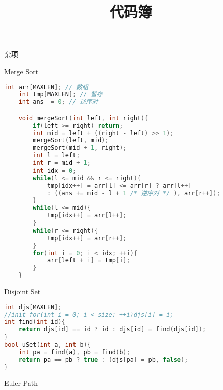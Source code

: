 \documentclass{article}
\title{代码簿}
\begin{document}
	\maketitle

	\begin{enumerate}

	{\bf \LARGE \item  杂项}

	\begin{itemize}

	{\bf \item  Merge Sort}
	\begin{lstlisting}[language = C++]
	int arr[MAXLEN]; // 数组
	int tmp[MAXLEN]; // 暂存
	int ans  = 0; // 逆序对

	void mergeSort(int left, int right){
		if(left >= right) return;
		int mid = left + ((right - left) >> 1);
		mergeSort(left, mid);
		mergeSort(mid + 1, right);
		int l = left;
		int r = mid + 1;
		int idx = 0;	
		while(l <= mid && r <= right){		
			tmp[idx++] = arr[l] <= arr[r] ? arr[l++] 
			: ((ans += mid - l + 1 /* 逆序对 */ ), arr[r++]);
		}
		while(l <= mid){
			tmp[idx++] = arr[l++];
		}
		while(r <= right){
			tmp[idx++] = arr[r++];
		}
		for(int i = 0; i < idx; ++i){
			arr[left + i] = tmp[i];
		}
	}
\end{lstlisting}

{\bf \item  Disjoint Set}

\begin{lstlisting}[language = C++]
int djs[MAXLEN]; 
//init for(int i = 0; i < size; ++i)djs[i] = i;
int find(int id){
	return djs[id] == id ? id : djs[id] = find(djs[id]);
}
bool uSet(int a, int b){
	int pa = find(a), pb = find(b);
	return pa == pb ? true : (djs[pa] = pb, false);	
}
\end{lstlisting}
\end{itemize}

{\bf \LARGE \item  Euler Path}
\begin{lstlisting}[language = C++]

\end{lstlisting}


\end{enumerate}
\end{document}
